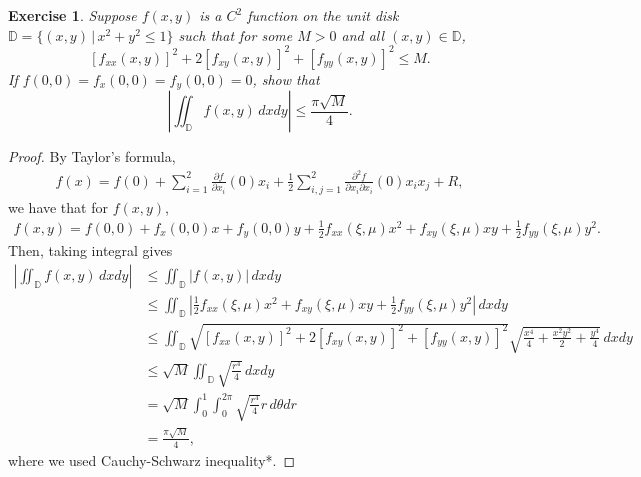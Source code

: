 \documentclass[11pt]{article}
\newtheorem{exercise}{Exercise}[section]
\theoremstyle{definition}
\numberwithin{equation}{subsection}
\begin{document}
\begin{exercise}
Suppose $f(x,y)$ is a $C^2$ function on the unit disk $\mathbb{D} = \{(x,y)\,|\,x^2+y^2\leq 1\}$ such that for some $M>0$ and all $(x,y)\in\mathbb{D}$,
$$ \left[f_{xx}(x,y)\right]^2 + 2\left[f_{xy}(x,y)\right]^2 + \left[f_{yy}(x,y)\right]^2 \leq M. $$
If $f(0,0) = f_x(0,0) = f_y(0,0) = 0$, show that
$$ \left\lvert \iint_{\mathbb{D}} f(x,y)\,\mathit{dx}\mathit{dy} \right\rvert \leq \frac{\pi\sqrt{M}}{4}. $$
\end{exercise}
\begin{proof}
By Taylor's formula, 
\begin{align*}
    f(x) = f(0) + \sum^2_{i=1} \frac{\partial f}{\partial x_i}(0) x_i + \frac{1}{2} \sum^2_{i,j=1} \frac{\partial^2 f}{\partial x_i \partial x_i}(0)x_i x_j + R,
\end{align*}
we have that for $f(x,y)$,
\begin{align*}
    f(x,y) = f(0,0) + f_x(0,0)x + f_y(0,0)y + \frac{1}{2} f_{xx}(\xi,\mu) x^2 + f_{xy}(\xi,\mu) xy + \frac{1}{2} f_{yy}(\xi,\mu) y^2.
\end{align*}
Then, taking integral gives
\begin{align*}
    \left|\iint_{\mathbb{D}} f(x,y)\, dxdy \right| & \leq \iint_{\mathbb{D}} \left|f(x,y)\right|\, dxdy \\
    & \leq \iint_{\mathbb{D}} \left| \frac{1}{2} f_{xx}(\xi,\mu) x^2 + f_{xy}(\xi,\mu) xy + \frac{1}{2} f_{yy}(\xi,\mu) y^2 \right|\, dxdy \\
    & \leq \iint_{\mathbb{D}} \sqrt{\left[f_{xx}(x,y)\right]^2 + 2\left[f_{xy}(x,y)\right]^2 + \left[f_{yy}(x,y)\right]^2} \sqrt{\frac{x^4}{4} + \frac{x^2y^2}{2} + \frac{y^4}{4}}\, dxdy \\
    & \leq \sqrt{M} \iint_{\mathbb{D}} \sqrt{\frac{r^4}{4}} \, dxdy \\
    & = \sqrt{M} \int^1_0 \int^{2\pi}_0 \sqrt{\frac{r^4}{4}} r \, d\theta dr \\
    & = \frac{\pi \sqrt{M}}{4},
\end{align*}
where we used Cauchy-Schwarz inequality*.
\end{proof}

\medskip
\end{document}
